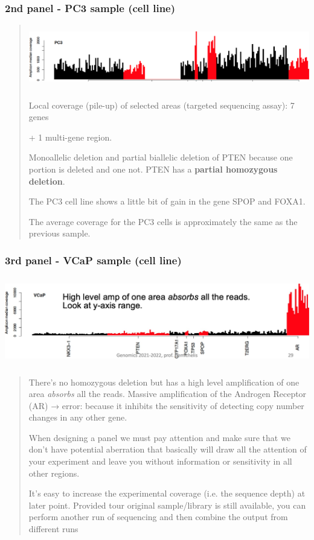 \hypertarget{nd-panel---pc3-sample-cell-line}{%
\subsubsection{2nd panel - PC3 sample (cell
line)}\label{nd-panel---pc3-sample-cell-line}}

\begin{quote}
\includegraphics[width=6.15327in,height=1.09125in]{image17.png}

Local coverage (pile-up) of selected areas (targeted sequencing assay):
7 genes

+ 1 multi-gene region.

Monoallelic deletion and partial biallelic deletion of PTEN because one
portion is deleted and one not. PTEN has a \textbf{partial homozygous
deletion}.

The PC3 cell line shows a little bit of gain in the gene SPOP and FOXA1.

The average coverage for the PC3 cells is approximately the same as the
previous sample.
\end{quote}

\hypertarget{rd-panel---vcap-sample-cell-line}{%
\subsubsection{3rd panel - VCaP sample (cell
line)}\label{rd-panel---vcap-sample-cell-line}}

\includegraphics[width=6.17134in,height=1.51875in]{image18.jpeg}

\begin{quote}
There's no homozygous deletion but has a high level amplification of one
area \emph{absorbs} all the reads. Massive amplification of the Androgen
Receptor (AR) → error: because it inhibits the sensitivity of detecting
copy number changes in any other gene.

When designing a panel we must pay attention and make sure that we don't
have potential aberration that basically will draw all the attention of
your experiment and leave you without information or sensitivity in all
other regions.

It's easy to increase the experimental coverage (i.e. the sequence
depth) at later point. Provided tour original sample/library is still
available, you can perform another run of sequencing and then combine
the output from different runs
\end{quote}

